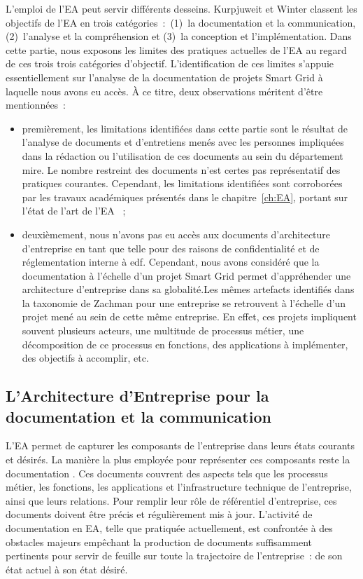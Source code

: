 L'emploi de l'EA peut servir différents desseins. Kurpjuweit et Winter
\cite{kurpjuweit2007viewpoint} classent les objectifs de l'EA en trois catégories~:~(1)~la documentation et la communication, (2)~l'analyse et la compréhension et (3)~la conception et l'implémentation.
Dans cette partie, nous exposons les limites des pratiques actuelles de l'EA au regard de ces trois trois catégories d'objectif. L'identification de ces limites s'appuie essentiellement sur l'analyse de la documentation de projets Smart Grid à laquelle nous avons eu accès. À ce titre, deux observations méritent d'être mentionnées~:

\begin{itemize}

 \item premièrement, les limitations identifiées dans cette partie sont le résultat de l'analyse de documents et d'entretiens menés avec les personnes impliquées dans la rédaction ou l'utilisation de ces documents au sein du département \gls{mire}. Le nombre restreint des documents n'est certes pas représentatif des pratiques courantes. Cependant, les limitations identifiées sont corroborées par les travaux académiques présentés dans le chapitre~\ref{ch:EA}, portant sur l'état de l'art de l'EA ~;

 \item deuxièmement, nous n'avons pas eu accès aux documents d'architecture d'entreprise en tant que telle pour des raisons de confidentialité et de réglementation interne à \gls{edf}. Cependant, nous avons considéré que la documentation à l'échelle d'un projet  Smart Grid permet d’appréhender une architecture d'entreprise dans sa globalité.Les mêmes artefacts identifiés dans la taxonomie de Zachman pour une entreprise se retrouvent à l'échelle d'un projet mené au sein de cette même entreprise. En effet, ces projets impliquent souvent plusieurs acteurs, une multitude de processus métier, une décomposition de ce processus en fonctions, des applications à implémenter, des objectifs à accomplir, etc.

\end{itemize}



 \subsection{L'Architecture d'Entreprise pour la documentation et la communication}


L'EA permet de capturer les composants de l'entreprise dans
leurs états courants et désirés. La manière la plus employée pour représenter
ces composants reste la documentation \cite{barn2013enterprise}. Ces documents
couvrent des aspects tels que les processus métier, les fonctions, les
applications et l'infrastructure technique de l'entreprise, ainsi que leurs
relations. Pour remplir leur rôle de référentiel d'entreprise, ces documents
doivent être précis et régulièrement mis à jour. L'activité de documentation en
EA, telle que pratiquée actuellement, est confrontée à des obstacles majeurs
empêchant la production de documents suffisamment pertinents pour servir de
feuille sur toute la trajectoire de l'entreprise~: de son état actuel à son
état désiré.

